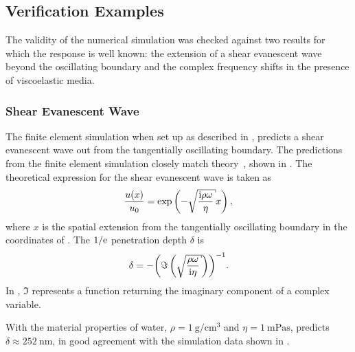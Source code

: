 \subsection{Verification Examples}
The validity of the numerical simulation was checked against two results
for which the response is well known: the extension of a shear evanescent
wave beyond the oscillating boundary and the complex frequency shifts in
the presence of viscoelastic media.

\subsubsection{Shear Evanescent Wave}
The finite element simulation when set up as described in
, predicts a shear evanescent wave out from
the tangentially oscillating boundary.  The predictions from the finite
element simulation closely match theory~\cite{steinem2007piezoelectric},
shown in .  The theoretical expression for the
shear evanescent wave is taken as~\cite{steinem2007piezoelectric}
\begin{equation}
 \frac{u(x)}{u_0} = \exp\left(-\sqrt{\frac{\mi \rho \omega}{\eta}} x\right),
\end{equation}
where $x$ is the spatial extension from the tangentially oscillating
boundary in the coordinates of .  The $1/{\mathrm{e}}$
penetration depth $\delta$ is
\begin{equation}
 \delta = -{\left(\Im\left(\sqrt{\frac{\rho\omega}{\mi\eta}}\right)\right)}^{-1}.
\label{eqn:suppshearwavedelta}
\end{equation}
In , $\Im$ represents a function returning
the imaginary component of a complex variable.

With the material properties of water,
$\rho=\SI{1}{\gram\per\centi\meter\cubed}$ and
$\eta=\SI{1}{\milli\pascal\second}$, 
predicts $\delta\approx\SI{252}{\nano\meter}$, in good agreement with the
simulation data shown in .


